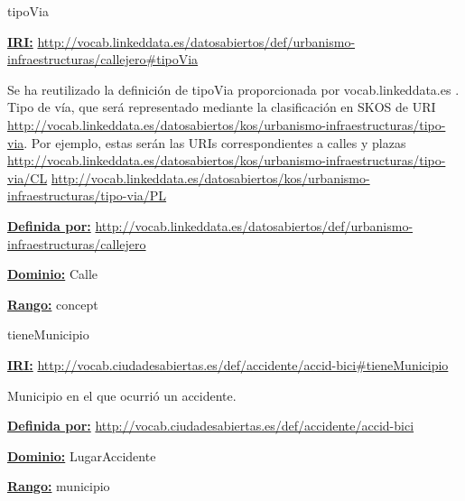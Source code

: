 \begin{mybox}{tipoVia}
\begin{flushleft}
\underline{\textbf{IRI:}}
\url{http://vocab.linkeddata.es/datosabiertos/def/urbanismo-infraestructuras/callejero#tipoVia}
\newline

Se ha reutilizado la definición de tipoVia proporcionada por vocab.linkeddata.es \cite{datoabiertos_tipoVia}.
Tipo de vía, que será representado mediante la clasificación en SKOS de URI \url{http://vocab.linkeddata.es/datosabiertos/kos/urbanismo-infraestructuras/tipo-via}. Por ejemplo, estas serán las URIs correspondientes a calles y plazas \url{http://vocab.linkeddata.es/datosabiertos/kos/urbanismo-infraestructuras/tipo-via/CL} \url{http://vocab.linkeddata.es/datosabiertos/kos/urbanismo-infraestructuras/tipo-via/PL}
\newline

\underline{\textbf{Definida por:}}
\url{http://vocab.linkeddata.es/datosabiertos/def/urbanismo-infraestructuras/callejero}
\newline

\underline{\textbf{Dominio:}}
		Calle
\newline

\underline{\textbf{Rango:}}
		concept

\end{flushleft}
\end{mybox}






\begin{mybox}{tieneMunicipio}
\begin{flushleft}
\underline{\textbf{IRI:}}
\url{http://vocab.ciudadesabiertas.es/def/accidente/accid-bici#tieneMunicipio}
\newline

Municipio en el que ocurrió un accidente.
\newline

\underline{\textbf{Definida por:}}
\url{http://vocab.ciudadesabiertas.es/def/accidente/accid-bici}
\newline

\underline{\textbf{Dominio:}}
		LugarAccidente
\newline

\underline{\textbf{Rango:}}
		municipio

\end{flushleft}
\end{mybox}



